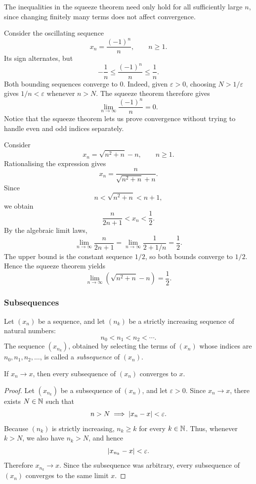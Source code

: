 \documentclass[11pt,a4paper]{amsart}
\begin{document}
The inequalities in the squeeze theorem need only hold for all sufficiently
large \(n\), since changing finitely many terms does not affect convergence.

\begin{example}
  Consider the oscillating sequence
  \[
    x_n=\frac{(-1)^n}{n}, \qquad n\geq1.
  \]
  Its sign alternates, but
  \[
    -\frac{1}{n}\leq\frac{(-1)^n}{n}\leq\frac{1}{n}.
  \]
  Both bounding sequences converge to \(0\). Indeed, given \(\varepsilon>0\),
  choosing \(N>1/\varepsilon\) gives \(1/n<\varepsilon\) whenever \(n>N\).
  The squeeze theorem therefore gives
  \[
    \lim_{n\to\infty}\frac{(-1)^n}{n}=0.
  \]
  Notice that the squeeze theorem lets us prove convergence without trying
  to handle even and odd indices separately.
\end{example}

\begin{example}
  Consider
  \[
    x_n=\sqrt{n^2+n}-n, \qquad n\geq1.
  \]
  Rationalising the expression gives
  \[
    x_n=\frac{n}{\sqrt{n^2+n}+n}.
  \]
  Since
  \[
    n<\sqrt{n^2+n}<n+1,
  \]
  we obtain
  \[
    \frac{n}{2n+1}<x_n<\frac{1}{2}.
  \]
  By the algebraic limit laws,
  \[
    \lim_{n\to\infty}\frac{n}{2n+1}
    =\lim_{n\to\infty}\frac{1}{2+1/n}
    =\frac{1}{2}.
  \]
  The upper bound is the constant sequence \(1/2\), so both bounds converge
  to \(1/2\). Hence the squeeze theorem yields
  \[
    \lim_{n\to\infty}\left(\sqrt{n^2+n}-n\right)=\frac{1}{2}.
  \]
\end{example}

\subsubsection{Subsequences}

\begin{definition}
  Let \((x_n)\) be a sequence, and let \((n_k)\) be a strictly increasing
  sequence of natural numbers:
  \[
    n_0<n_1<n_2<\cdots.
  \]
  The sequence \((x_{n_k})\), obtained by selecting the terms of \((x_n)\)
  whose indices are \(n_0,n_1,n_2,\ldots\), is called a \emph{subsequence}
  of \((x_n)\).
\end{definition}

\begin{theorem}
  If \(x_n\to x\), then every subsequence of \((x_n)\) converges to \(x\).
\end{theorem}

\begin{proof}
  Let \((x_{n_k})\) be a subsequence of \((x_n)\), and let \(\varepsilon>0\).
  Since \(x_n\to x\), there exists \(N\in\mathbb{N}\) such that
  \[
    n>N\implies\lvert x_n-x\rvert<\varepsilon.
  \]
  Because \((n_k)\) is strictly increasing, \(n_k\geq k\) for every
  \(k\in\mathbb{N}\). Thus, whenever \(k>N\), we also have \(n_k>N\), and hence
  \[
    \lvert x_{n_k}-x\rvert<\varepsilon.
  \]
  Therefore \(x_{n_k}\to x\). Since the subsequence was arbitrary, every
  subsequence of \((x_n)\) converges to the same limit \(x\).
\end{proof}
\end{document}
